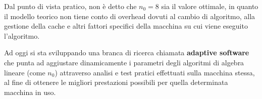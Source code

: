 Dal punto di vista pratico, non è detto che \(n_0 = 8\) sia il valore ottimale, in quanto il modello teorico non tiene conto
di overhead dovuti al cambio di algoritmo, alla gestione della cache e altri fattori specifici della macchina su cui viene
eseguito l'algoritmo.

Ad oggi si sta sviluppando una branca di ricerca chiamata \textbf{adaptive software} che punta ad aggiustare dinamicamente i parametri
degli algoritmi di algebra lineare (come \(n_0\)) attraverso analisi e test pratici effettuati sulla macchina stessa, al fine
di ottenere le migliori prestazioni possibili per quella determinata macchina in uso.

